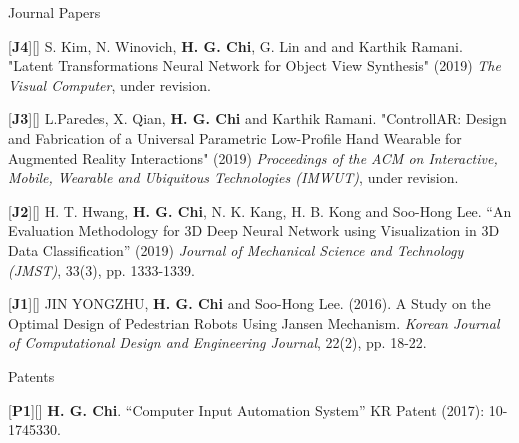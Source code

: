 \begin{cventries}
\cvpub
{Journal Papers} %
{ %
\begin{cvitems}
\item {[\textbf{J4}][\href{https://docs.google.com/viewer?url=https://github.com/stnoah1/CV/raw/master/documents/VisualComputer.pdf}{}] S. Kim, N. Winovich, \textbf{H. G. Chi}, G. Lin and and Karthik Ramani. "Latent Transformations Neural Network for Object View Synthesis" (2019) \textit{The Visual Computer}, under revision.}
\item {[\textbf{J3}][\href{https://docs.google.com/viewer?url=https://github.com/stnoah1/CV/raw/master/documents/ControllAR.pdf}{}] L.Paredes, X. Qian, \textbf{H. G. Chi} and Karthik Ramani. "ControllAR: Design and Fabrication of a Universal Parametric Low-Profile Hand Wearable for Augmented Reality Interactions" (2019) \textit{Proceedings of the ACM on Interactive, Mobile, Wearable and Ubiquitous Technologies (IMWUT)}, under revision.}
\item {[\textbf{J2}][\href{https://link.springer.com/content/pdf/10.1007/s12206-019-0233-1.pdf}{}] H. T. Hwang, \textbf{H. G. Chi}, N. K. Kang, H. B. Kong and Soo-Hong Lee. “An Evaluation Methodology for 3D Deep Neural Network using Visualization in 3D Data Classification” (2019) \textit{Journal of Mechanical Science and Technology (JMST)}, 33(3), pp. 1333-1339.}
\item {[\textbf{J1}][\href{https://docs.google.com/viewer?url=https://github.com/stnoah1/CV/raw/master/documents/Edison.pdf}{}] JIN YONGZHU, \textbf{H. G. Chi} and Soo-Hong Lee. (2016). A Study on the Optimal Design of Pedestrian Robots Using Jansen Mechanism. \textit{Korean Journal of Computational Design and Engineering Journal}, 22(2), pp. 18-22.}
\end{cvitems}
}
\cvpub
{Patents}{
\begin{cvitems}
\item {[\textbf{P1}][\href{https://docs.google.com/viewer?url=https://github.com/stnoah1/CV/raw/master/documents/patent.pdf}{}] \textbf{H. G. Chi}.  “Computer Input Automation System” KR Patent (2017): 10-1745330.}
\end{cvitems}
}



\end{cventries}